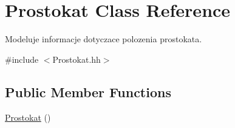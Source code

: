 \hypertarget{class_prostokat}{\section{Prostokat Class Reference}
\label{class_prostokat}
}


Modeluje informacje dotyczace polozenia prostokata.  




{\ttfamily \#include $<$Prostokat.\+hh$>$}

\subsection*{Public Member Functions}
\begin{DoxyCompactItemize}
\item 
\hypertarget{class_prostokat_acc97afb4da6106f85d2b36c0b4ba7e26}{\hyperlink{class_prostokat_acc97afb4da6106f85d2b36c0b4ba7e26}{Prostokat} ()}\label{class_prostokat_acc97afb4da6106f85d2b36c0b4ba7e26}


\end{DoxyCompactItemize}
